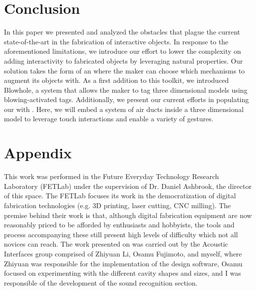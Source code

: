   \section{Conclusion}
    In this paper we presented and analyzed the obstacles that plague the
    current state-of-the-art in the fabrication of interactive objects. In
    response to the aforementioned limitations, we introduce  our effort to
    lower the complexity on adding interactivity to fabricated objects by
    leveraging natural properties. Our solution takes the form of an \itoolkit
    where the maker can choose which mechanisms to augment its objects with. As
    a first addition to this toolkit, we introduced Blowhole, a system that
    allows the maker to tag three dimensional models using blowing-activated
    tags. Additionally, we present our current efforts in populating our
    \itoolkit with \at. Here, we will embed a system of air ducts inside a
    three dimensional model to leverage touch interactions and enable a variety
    of gestures.

  
  

  \newpage
  \section{Appendix}
    This work was performed in the Future Everyday Technology Research
    Laboratory (FETLab) under the supervision of Dr. Daniel Ashbrook, the
    director of this space. The FETLab focuses its work in the democratization
    of digital fabrication technologies (e.g. 3D printing, laser cutting, CNC
    milling). The premise behind their work is that, although digital
    fabrication equipment are now reasonably priced to be afforded by
    enthusiasts and hobbyists, the tools and process accompanying these still
    present high levels of difficulty which not all novices can reach. The work
    presented on \bh was carried out by the Acoustic Interfaces group comprised
    of Zhiyuan Li, Osamu Fujimoto, and myself, where Zhiyuan was responsible
    for the implementation of the design software, Osamu focused on
    experimenting with the different cavity shapes and sizes, and I was
    responsible of the development of the sound recognition section.



